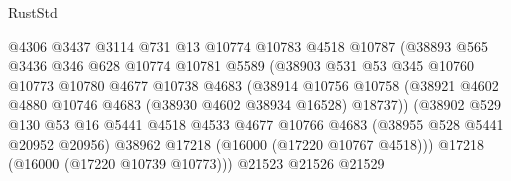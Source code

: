 \begin{lexlean}{RustStd}
\begin{coremodule}
                                  @4306
                                  @3437
                                  @3114
                                  @731
                                  @13
                                  @10774
                                  @10783
                                  @4518
                                  @10787
                                  (@38893
                                    @565
                                    @3436
                                    @346
                                    @628
                                    @10774
                                    @10781
                                    @5589
                                    (@38903
                                      @531
                                      @53
                                      @345
                                      @10760
                                      @10773
                                      @10780
                                      @4677
                                      @10738
                                      @4683
                                      (@38914
                                        @10756
                                        @10758
                                        (@38921
                                          @4602
                                          @4880
                                          @10746
                                          @4683
                                          (@38930 @4602 @38934 @16528)
                                          @18737))
                                      (@38902
                                        @529
                                        @130
                                        @53
                                        @16
                                        @5441
                                        @4518
                                        @4533
                                        @4677
                                        @10766
                                        @4683
                                        (@38955 @528 @5441 @20952 @20956)
                                        @38962
                                        @17218
                                        (@16000 (@17220 @10767 @4518)))
                                      @17218
                                      (@16000 (@17220 @10739 @10773)))
                                    @21523
                                    @21526
                                    @21529

\end{coremodule}
\end{lexlean}
